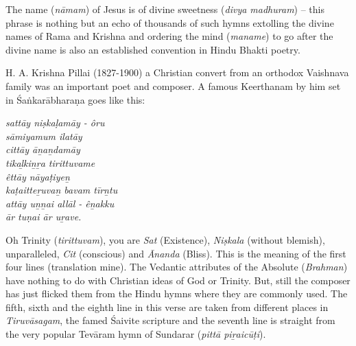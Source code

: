 The name (\textit{nāmam}) of Jesus is of divine sweetness (\textit{divya madhuram}) – this phrase is nothing but an echo of thousands of such hymns extolling the divine names of Rama and Krishna and ordering the mind (\textit{maname}) to go after the divine name is also an established convention in Hindu Bhakti poetry.

\newpage

H. A. Krishna Pillai (1827-1900) a Christian convert from an orthodox Vaishnava family was an important poet and composer. A famous Keerthanam by him set in Śaṅkarābharaṇa goes like this:

\begin{myquote}
\textit{sattāy niṣkaḷamāy - ôru\\ sāmiyamum ilatāy \\ cittāy āṉaṉdamāy\\ tikaḻkiṉṟa tirittuvame\\ êttāy nāyaṭiyeṉ\\ kaṭaitteṟuvaṉ bavam tīrṉtu\\ attāy uṉṉai allāl - êṉakku\\ ār tuṇai ār uṟave.}
\end{myquote}

\begin{myquote}
\end{myquote}

Oh Trinity (\textit{tirittuvam}), you are \textit{Sat} (Existence), \textit{Niṣkala} (without blemish), unparalleled, \textit{Cit} (conscious) and \textit{Ānanda} (Bliss). This is the meaning of the first four lines (translation mine). The Vedantic attributes of the Absolute (\textit{Brahman}) have nothing to do with Christian ideas of God or Trinity. But, still the composer has just flicked them from the Hindu hymns where they are commonly used. The fifth, sixth and the eighth line in this verse are taken from different places in \textit{Tiruvāsagam}, the famed Śaivite scripture and the seventh line is straight from the very popular Tevāram hymn of Sundarar (\textit{pittā piṟaicūṭi}).

